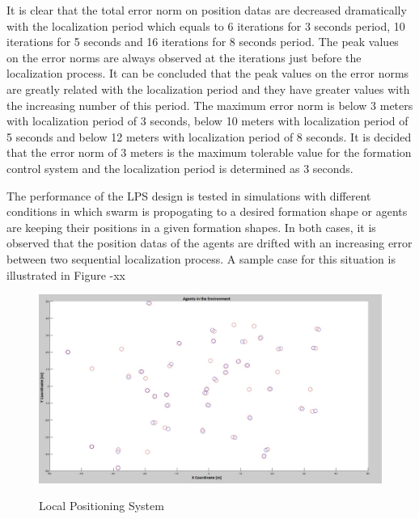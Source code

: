 It is clear that the total error norm on position datas are decreased dramatically with the localization period which equals to 6 iterations for 3 seconds period, 10 iterations for 5 seconds and 16 iterations for 8 seconds period. The peak values on the error norms are always observed at the iterations just before the localization process. It can be concluded that the peak values on the error norms are greatly related with the localization period and they have greater values with the increasing number of this period. The maximum error norm is below 3 meters with localization period of 3 seconds, below 10 meters with localization period of 5 seconds and below 12 meters with localization period of 8 seconds. It is decided  that the error norm of 3 meters is the maximum tolerable value for the formation control system and the localization period is determined as 3 seconds. 

The performance of the LPS design is tested in simulations with different conditions in which swarm is propogating to a desired formation shape or agents are keeping their positions in a given formation shapes.  In both cases, it is observed that the position datas of the agents are drifted with an increasing error between two  sequential localization process. A sample case for this situation is illustrated in Figure -xx

\begin{figure}[H]
\caption{Local Positioning System}
\centering
\includegraphics[scale = 0.65]{Pozisyon_1_Hatali}
\label{fig:lps}
\end{figure}

